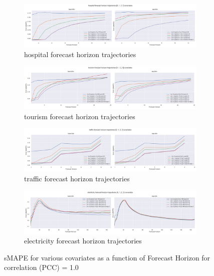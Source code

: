 \documentclass[letterpaper]{article}
\begin{document}
\begin{figure}[tbp]
\begin{subfigure}{\textwidth}
\centering
\includegraphics[width=\linewidth]{figures/base-lstm_seg-lstm_hospital_k_0_1_2_3_trajectory.png}
\caption{hospital forecast horizon trajectories}
\label{fig:base-lstm_seg-lstm_hospital_k_0_1_2_3_trajectory}
\end{subfigure}

\begin{subfigure}{\textwidth}
\centering
\includegraphics[width=\linewidth]{figures/base-lstm_seg-lstm_tourism_k_0_1_2_3_trajectory.png}
\caption{tourism forecast horizon trajectories}
\label{fig:base-lstm_seg-lstm_tourism_k_0_1_2_3_trajectory}
\end{subfigure}

\begin{subfigure}{\textwidth}
\centering
\includegraphics[width=\linewidth]{figures/base-lstm_seg-lstm_traffic_k_0_1_2_3_trajectory.png}
\caption{traffic forecast horizon trajectories}
\label{fig:base-lstm_seg-lstm_traffic_k_0_1_2_3_trajectory}
\end{subfigure}

\begin{subfigure}{\textwidth}
\centering
\includegraphics[width=\linewidth]{figures/base-lstm_seg-lstm_electricity_k_0_1_2_3_trajectory.png}
\caption{electricity forecast horizon trajectories}
\label{fig:base-lstm_seg-lstm_electricity_k_0_1_2_3_trajectory}
\end{subfigure}

\caption{sMAPE for various covariates as a function of Forecast Horizon for correlation (PCC) = 1.0}
\label{fig:base-lstm_seg-lstm_k_0_1_2_3_trajectory}
\end{figure}
\end{document}
